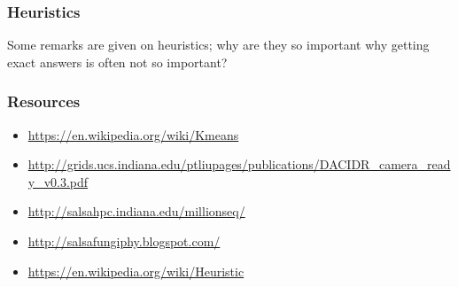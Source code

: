 \subsubsection{Heuristics}\label{heuristics}

Some remarks are given on heuristics; why are they so important why
getting exact answers is often not so important?

\subsubsection{Resources}\label{resources}

\begin{itemize}
\tightlist
\item
  \url{https://en.wikipedia.org/wiki/Kmeans}
\item
  \url{http://grids.ucs.indiana.edu/ptliupages/publications/DACIDR_camera_ready_v0.3.pdf}
\item
  \url{http://salsahpc.indiana.edu/millionseq/}
\item
  \url{http://salsafungiphy.blogspot.com/}
\item
  \url{https://en.wikipedia.org/wiki/Heuristic}
\end{itemize}

